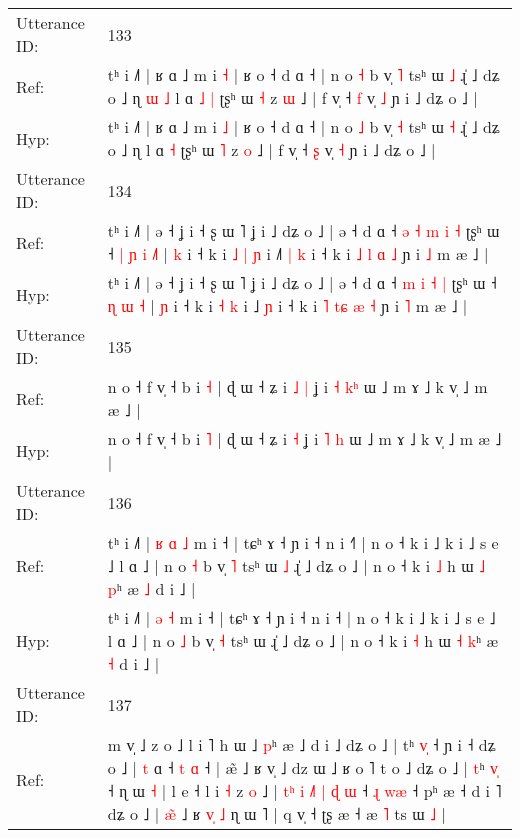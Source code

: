 \documentclass[10pt]{article}
\DeclareRobustCommand{\hl}[1]{{\textcolor{red}{#1}}}
\begin{document}
\begin{longtable}{ll}
 \\
\midrule
Utterance ID: & 133 \\
Ref: & tʰ i ˩˥ | ʁ ɑ ˩ m i \hl{˧} | ʁ o ˧ d ɑ ˧ | n o \hl{˧} b v̩ \hl{˥} tsʰ ɯ \hl{˩} ɻ̍ ˩ dʑ o ˩ ɳ\hl{ }\hl{ɯ}\hl{ }\hl{˩} l ɑ\hl{ }\hl{˩} \hl{|} ʈʂʰ ɯ \hl{˧} z \hl{ɯ} ˩ | f v̩ ˧ \hl{f} v̩ \hl{˩} ɲ i ˩ dʑ o ˩ |
 \\
Hyp: & tʰ i ˩˥ | ʁ ɑ ˩ m i \hl{˩} | ʁ o ˧ d ɑ ˧ | n o \hl{˩} b v̩ \hl{˧} tsʰ ɯ \hl{˧} ɻ̍ ˩ dʑ o ˩ ɳ\hl{}\hl{}\hl{}\hl{} l ɑ\hl{}\hl{} \hl{˧} ʈʂʰ ɯ \hl{˥} z \hl{o} ˩ | f v̩ ˧ \hl{ʂ} v̩ \hl{˧} ɲ i ˩ dʑ o ˩ |
 \\
\midrule
Utterance ID: & 134 \\
Ref: & tʰ i ˩˥ | ə ˧ ʝ i ˧ ʂ ɯ ˥ ʝ i ˩ dʑ o ˩ | ə ˧ d ɑ ˧\hl{ }\hl{ə} \hl{˧} \hl{m} \hl{i} \hl{˧} ʈʂʰ ɯ ˧\hl{ }\hl{|} \hl{ɲ} \hl{i} \hl{˩}\hl{˥} | \hl{k} i ˧ k i\hl{ }\hl{˩} \hl{|} \hl{ɲ} i ˩\hl{˥}\hl{ }\hl{|} \hl{k} i ˧ k i \hl{˩} \hl{}\hl{l} \hl{ɑ} \hl{˩} ɲ i \hl{˩} m æ ˩ |
 \\
Hyp: & tʰ i ˩˥ | ə ˧ ʝ i ˧ ʂ ɯ ˥ ʝ i ˩ dʑ o ˩ | ə ˧ d ɑ ˧\hl{}\hl{} \hl{m} \hl{i} \hl{˧} \hl{|} ʈʂʰ ɯ ˧\hl{}\hl{} \hl{ɳ} \hl{ɯ} \hl{}\hl{˧} | \hl{ɲ} i ˧ k i\hl{}\hl{} \hl{˧} \hl{k} i ˩\hl{}\hl{}\hl{} \hl{ɲ} i ˧ k i \hl{˥} \hl{t}\hl{ɕ} \hl{æ} \hl{˧} ɲ i \hl{˥} m æ ˩ |
 \\
\midrule
Utterance ID: & 135 \\
Ref: & n o ˧ f v̩ ˧ b i \hl{˧} | ɖ ɯ ˧ ʑ i\hl{ }\hl{˩} \hl{|} ʝ i \hl{˧} \hl{k}\hl{ʰ} ɯ ˩ m ɤ ˩ k v̩ ˩ m æ ˩ |
 \\
Hyp: & n o ˧ f v̩ ˧ b i \hl{˥} | ɖ ɯ ˧ ʑ i\hl{}\hl{} \hl{˧} ʝ i \hl{˥} \hl{}\hl{h} ɯ ˩ m ɤ ˩ k v̩ ˩ m æ ˩ |
 \\
\midrule
Utterance ID: & 136 \\
Ref: & tʰ i ˩˥ |\hl{ }\hl{ʁ} \hl{ɑ} \hl{˩} m i ˧ | tɕʰ ɤ ˧ ɲ i ˧ n i ˧\hl{˥} | n o ˧ k i ˩ k i ˩ s e ˩ l ɑ ˩ | n o \hl{˧} b v̩ \hl{˥} tsʰ ɯ\hl{ }\hl{˩} ɻ̍ ˩ dʑ o ˩ | n o ˧ k i \hl{˩} h ɯ \hl{˩} \hl{p}ʰ æ \hl{˩} d i ˩ |
 \\
Hyp: & tʰ i ˩˥ |\hl{}\hl{} \hl{ə} \hl{˧} m i ˧ | tɕʰ ɤ ˧ ɲ i ˧ n i ˧\hl{} | n o ˧ k i ˩ k i ˩ s e ˩ l ɑ ˩ | n o \hl{˩} b v̩ \hl{˧} tsʰ ɯ\hl{}\hl{} ɻ̍ ˩ dʑ o ˩ | n o ˧ k i \hl{˧} h ɯ \hl{˧} \hl{k}ʰ æ \hl{˧} d i ˩ |
 \\
\midrule
Utterance ID: & 137 \\
Ref: & m v̩ ˩ z o ˩ l i ˥ h ɯ ˩ \hl{p}ʰ æ ˩ d i ˩\hl{}\hl{} dʑ o ˩ | tʰ \hl{v}\hl{̩} ˧ ɲ i ˧ dʑ o ˩ | \hl{t} ɑ ˧ \hl{t} \hl{ɑ} ˧ | æ̃ ˩ ʁ v̩ ˩ dz ɯ ˩ ʁ o \hl{}˥ t o ˩ dʑ o ˩ | \hl{}\hl{t}ʰ \hl{v}\hl{̩} ˧ ɳ ɯ \hl{˧} | l e ˧ l i \hl{˧} z \hl{o} ˩ |\hl{ }\hl{t}\hl{ʰ}\hl{ }\hl{i}\hl{ }\hl{˩}\hl{˥} \hl{|} \hl{ɖ}\hl{ }\hl{ɯ} ˧ \hl{ɻ} \hl{w}\hl{æ} ˧ pʰ æ ˧ d\hl{} i ˥ dʑ o ˩ | \hl{æ}\hl{̃} ˩ ʁ \hl{v}\hl{̩} \hl{˩} ɳ ɯ ˥ | q v̩ ˧ ʈʂ æ ˧ æ \hl{˥} ts ɯ \hl{˩} |

\end{longtable}
\end{document}
